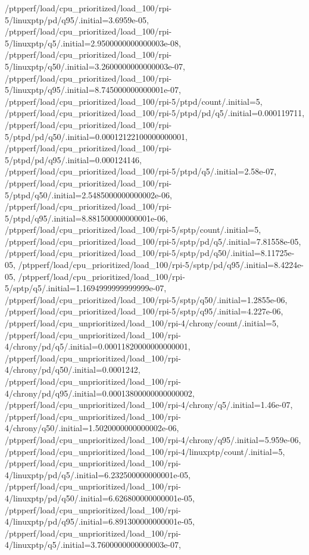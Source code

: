 {    /ptpperf/load/cpu_prioritized/load_100/rpi-5/linuxptp/pd/q95/.initial=3.6959e-05,
    /ptpperf/load/cpu_prioritized/load_100/rpi-5/linuxptp/q5/.initial=2.9500000000000003e-08,
    /ptpperf/load/cpu_prioritized/load_100/rpi-5/linuxptp/q50/.initial=3.2600000000000003e-07,
    /ptpperf/load/cpu_prioritized/load_100/rpi-5/linuxptp/q95/.initial=8.745000000000001e-07,
    /ptpperf/load/cpu_prioritized/load_100/rpi-5/ptpd/count/.initial=5,
    /ptpperf/load/cpu_prioritized/load_100/rpi-5/ptpd/pd/q5/.initial=0.000119711,
    /ptpperf/load/cpu_prioritized/load_100/rpi-5/ptpd/pd/q50/.initial=0.00012122100000000001,
    /ptpperf/load/cpu_prioritized/load_100/rpi-5/ptpd/pd/q95/.initial=0.000124146,
    /ptpperf/load/cpu_prioritized/load_100/rpi-5/ptpd/q5/.initial=2.58e-07,
    /ptpperf/load/cpu_prioritized/load_100/rpi-5/ptpd/q50/.initial=2.5485000000000002e-06,
    /ptpperf/load/cpu_prioritized/load_100/rpi-5/ptpd/q95/.initial=8.881500000000001e-06,
    /ptpperf/load/cpu_prioritized/load_100/rpi-5/sptp/count/.initial=5,
    /ptpperf/load/cpu_prioritized/load_100/rpi-5/sptp/pd/q5/.initial=7.81558e-05,
    /ptpperf/load/cpu_prioritized/load_100/rpi-5/sptp/pd/q50/.initial=8.11725e-05,
    /ptpperf/load/cpu_prioritized/load_100/rpi-5/sptp/pd/q95/.initial=8.4224e-05,
    /ptpperf/load/cpu_prioritized/load_100/rpi-5/sptp/q5/.initial=1.1694999999999999e-07,
    /ptpperf/load/cpu_prioritized/load_100/rpi-5/sptp/q50/.initial=1.2855e-06,
    /ptpperf/load/cpu_prioritized/load_100/rpi-5/sptp/q95/.initial=4.227e-06,
    /ptpperf/load/cpu_unprioritized/load_100/rpi-4/chrony/count/.initial=5,
    /ptpperf/load/cpu_unprioritized/load_100/rpi-4/chrony/pd/q5/.initial=0.00011820000000000001,
    /ptpperf/load/cpu_unprioritized/load_100/rpi-4/chrony/pd/q50/.initial=0.0001242,
    /ptpperf/load/cpu_unprioritized/load_100/rpi-4/chrony/pd/q95/.initial=0.00013800000000000002,
    /ptpperf/load/cpu_unprioritized/load_100/rpi-4/chrony/q5/.initial=1.46e-07,
    /ptpperf/load/cpu_unprioritized/load_100/rpi-4/chrony/q50/.initial=1.5020000000000002e-06,
    /ptpperf/load/cpu_unprioritized/load_100/rpi-4/chrony/q95/.initial=5.959e-06,
    /ptpperf/load/cpu_unprioritized/load_100/rpi-4/linuxptp/count/.initial=5,
    /ptpperf/load/cpu_unprioritized/load_100/rpi-4/linuxptp/pd/q5/.initial=6.232500000000001e-05,
    /ptpperf/load/cpu_unprioritized/load_100/rpi-4/linuxptp/pd/q50/.initial=6.626800000000001e-05,
    /ptpperf/load/cpu_unprioritized/load_100/rpi-4/linuxptp/pd/q95/.initial=6.891300000000001e-05,
    /ptpperf/load/cpu_unprioritized/load_100/rpi-4/linuxptp/q5/.initial=3.7600000000000003e-07,
}
